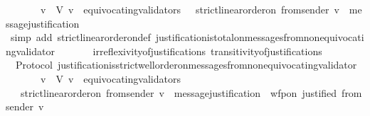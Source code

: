 \begin{isabellebody}
\ \ {\isachardoublequoteopen}{\isasymforall}\ {\isasymsigma}\ {\isasymin}\ {\isasymSigma}{\isachardot}\ {\isacharparenleft}{\isasymforall}\ v\ {\isasymin}\ V{\isachardot}\ v\ {\isasymnotin}\ equivocating{\isacharunderscore}validators\ {\isasymsigma}\ {\isasymlongrightarrow}\ strict{\isacharunderscore}linear{\isacharunderscore}order{\isacharunderscore}on\ {\isacharparenleft}from{\isacharunderscore}sender\ {\isacharparenleft}v{\isacharcomma}\ {\isasymsigma}{\isacharparenright}{\isacharparenright}\ message{\isacharunderscore}justification{\isacharparenright}{\isachardoublequoteclose}\isanewline
%
\isadelimproof
\ \ %
\endisadelimproof
%
\isatagproof
{}\isamarkupfalse%
\ {\isacharparenleft}simp\ add{\isacharcolon}\ strict{\isacharunderscore}linear{\isacharunderscore}order{\isacharunderscore}on{\isacharunderscore}def\ justification{\isacharunderscore}is{\isacharunderscore}total{\isacharunderscore}on{\isacharunderscore}messages{\isacharunderscore}from{\isacharunderscore}non{\isacharunderscore}equivocating{\isacharunderscore}validator\ \isanewline
\ \ \ \ \ \ irreflexivity{\isacharunderscore}of{\isacharunderscore}justifications\ transitivity{\isacharunderscore}of{\isacharunderscore}justifications{\isacharparenright}%
\endisatagproof
{\isafoldproof}%
%
\isadelimproof
\isanewline
%
\endisadelimproof
\isanewline
\isanewline
{}\isamarkupfalse%
\ {\isacharparenleft}\ Protocol{\isacharparenright}\ justification{\isacharunderscore}is{\isacharunderscore}strict{\isacharunderscore}well{\isacharunderscore}order{\isacharunderscore}on{\isacharunderscore}messages{\isacharunderscore}from{\isacharunderscore}non{\isacharunderscore}equivocating{\isacharunderscore}validator{\isacharcolon}\isanewline
\ \ {\isachardoublequoteopen}{\isasymforall}\ {\isasymsigma}\ {\isasymin}\ {\isasymSigma}{\isachardot}\ {\isacharparenleft}{\isasymforall}\ v\ {\isasymin}\ V{\isachardot}\ v\ {\isasymnotin}\ equivocating{\isacharunderscore}validators\ {\isasymsigma}\ \isanewline
\ \ {\isasymlongrightarrow}\ strict{\isacharunderscore}linear{\isacharunderscore}order{\isacharunderscore}on\ {\isacharparenleft}from{\isacharunderscore}sender\ {\isacharparenleft}v{\isacharcomma}\ {\isasymsigma}{\isacharparenright}{\isacharparenright}\ message{\isacharunderscore}justification\ {\isasymand}\ wfp{\isacharunderscore}on\ justified\ {\isacharparenleft}from{\isacharunderscore}sender\ {\isacharparenleft}v{\isacharcomma}\ {\isasymsigma}{\isacharparenright}{\isacharparenright}{\isacharparenright}{\isachardoublequoteclose}\isanewline
%
\isadelimproof
\ \ %
\endisadelimproof
%

\end{isabellebody}
